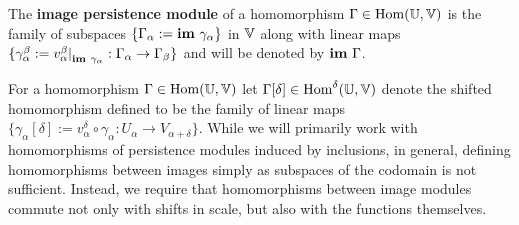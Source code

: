 \begin{definition}
  The \textbf{image persistence module} of a homomorphism $\Gamma\in\mathrm{Hom}(\mathbb{U},\mathbb{V})$ is the family of subspaces $\{\Gamma_\alpha :=\mathbf{im}~\gamma_\alpha\}$ in $\mathbb{V}$ along with linear maps $\{\gamma_\alpha^\beta := v_\alpha^\beta\mathord{\mid}_{\mathbf{im}~\gamma_\alpha} : \Gamma_\alpha\to\Gamma_\beta\}$ and will be denoted by $\mathbf{im}~\Gamma$.
\end{definition}

For a homomorphism $\Gamma\in\mathrm{Hom}(\mathbb{U}, \mathbb{V})$ let $\Gamma[\delta]\in \mathrm{Hom}^{\delta}(\mathbb{U}, \mathbb{V})$ denote the shifted homomorphism defined to be the family of linear maps $\{\gamma_\alpha[\delta] := v_\alpha^\delta\circ \gamma_\alpha : U_\alpha\to V_{\alpha+\delta}\}$.
While we will primarily work with homomorphisms of persistence modules induced by inclusions, in general, defining homomorphisms between images simply as subspaces of the codomain is not sufficient.
Instead, we require that homomorphisms between image modules commute not only with shifts in scale, but also with the functions themselves.

